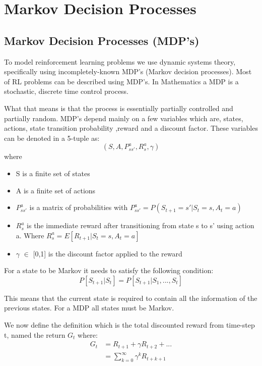 \graphicspath{{MDP\_and\_DP/fig/}}

\chapter{Markov Decision Processes}
\label{chap:MDP_and_DP}

\section{Markov Decision Processes (MDP's)}

To model reinforcement learning problems we use dynamic systems theory, specifically using incompletely-known MDP's (Markov decision
processes). Most of RL problems can be described using MDP's. In Mathematics a MDP is a stochastic, discrete time control process.

What that means is that the process is essentially partially controlled and partially random. MDP's depend mainly on a few variables which are, states, actions, state transition probability ,reward and a discount factor\cite{sutton_barto}. These variables can be denoted in a 5-tuple as:
\[(S,A,P^{a}_{ss'},R^{a}_{s},\gamma)\] where
\begin{itemize}
	\item S is a finite set of states
	\item A is a finite set of actions
	\item $P^{a}_{ss'}$ is a matrix of probabilities with $P^{a}_{ss'} = P(S_{t+1} = s' | S_t = s,A_t = a) $
	\item $R^{a}_{s}$ is the immediate reward after transitioning from state s to s' using action a. Where $R^{a}_{s} = E[R_{t+1}|S_t =s, A_t =a]$
	\item $\gamma$ $\in$ [0,1] is the discount factor applied to the reward
\end{itemize}

For a state to be Markov it needs to satisfy the following condition:
\[P[S_{t+1}|S_{t}] = P[S_{t+1}|S_{1},...,S_{t}]\]

This means that the current state is required to contain all the information of the previous states. For a MDP all states must be Markov.

We now define the definition which is the total discounted reward from time-step t, named the return $G_t$ where:
\begin{align}
	G_t &= R_{t+1}+\gamma R_{t+2} + ... \\
	&= \sum_{k=0}^{\infty}\gamma^{k} R_{t+k+1}
	\label{eq:G_t}
\end{align}

